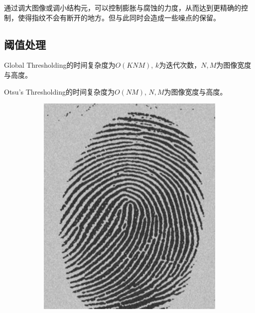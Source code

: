 \documentclass{article}
\begin{document}
通过调大图像或调小结构元，可以控制膨胀与腐蚀的力度，从而达到更精确的控制，使得指纹不会有断开的地方。但与此同时会造成一些噪点的保留。

\subsection{阈值处理}

Global Thresholding的时间复杂度为$O(KNM)$, $k$为迭代次数，$N, M$为图像宽度与高度。

Otsu's Thresholding的时间复杂度为$O(NM)$, $N, M$为图像宽度与高度。


\begin{figure}[htbp]
    \centering
    \begin{subfigure}{.32\textwidth}
        \includegraphics[width=\linewidth]{img/Fig1038(a)(noisy_fingerprint).jpg}
    \end{subfigure}
    \begin{subfigure}{.32\textwidth}

\end{subfigure}
\end{figure}
\end{document}
